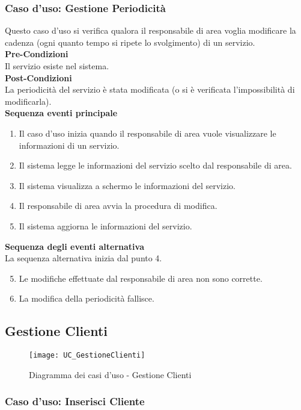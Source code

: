 \documentclass[green, fancy, 11pt]{elegantbook}
\begin{document}
\subsubsection{Caso d'uso: Gestione Periodicità}
Questo caso d’uso si verifica qualora il responsabile di area voglia modificare la cadenza (ogni quanto tempo si ripete lo svolgimento) di un servizio.\\
\textbf{Pre-Condizioni}\\
Il servizio esiste nel sistema.\\
\textbf{Post-Condizioni}\\
La periodicità del servizio è stata modificata (o si è verificata l’impossibilità di modificarla).\\
\textbf{Sequenza eventi principale}
\begin{enumerate}
	\item Il caso d’uso inizia quando il responsabile di area vuole visualizzare le informazioni di un servizio.
	\item Il sistema legge le informazioni del servizio scelto dal responsabile di area.
	\item Il sistema visualizza a schermo le informazioni del servizio.
	\item Il responsabile di area avvia la procedura di modifica.
	\item Il sistema aggiorna le informazioni del servizio.
\end{enumerate}
\textbf{Sequenza degli eventi alternativa}\\
La sequenza alternativa inizia dal punto 4.
\begin{enumerate}
	\setcounter{enumi}{4}
	\item Le modifiche effettuate dal responsabile di area non sono corrette.
	\item La modifica della periodicità fallisce.
\end{enumerate}
\newpage

\subsection{Gestione Clienti}
\begin{figure}[H]
	\centering
	\texttt{[image: UC\_GestioneClienti]}
	\caption{Diagramma dei casi d'uso - Gestione Clienti}
\end{figure}

\subsubsection{Caso d'uso: Inserisci Cliente}
\end{document}
